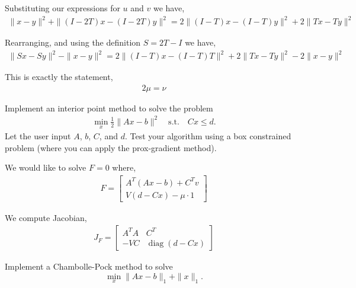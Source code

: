 \documentclass[10pt]{article}
\begin{document}
\begin{solution}[Solution]
\begin{enumerate}[label=(\alph*)]
        Substituting our expressions for \( u \) and \( v \) we have,
        \begin{align*}
            \| x - y \|^2 + \| (I-2T)x - (I-2T)y \|^2 = 2\|(I-T)x - (I-T)y\|^2 + 2\|Tx-Ty\|^2
        \end{align*}

        Rearranging, and using the definition \( S = 2T-I \) we have,
        \begin{align*}
            \|Sx-Sy\|^2 - \|x-y\|^2 = 2\|(I-T)x - (I-T)T\|^2 + 2\|Tx-Ty\|^2 - 2\|x-y\|^2
        \end{align*}

        This is exactly the statement,
        \begin{align*}
            2\mu = \nu \tag*{\qed}
        \end{align*}
        
\end{enumerate}
\end{solution}

\begin{problem}[Problem 4]
Implement an interior point method to solve the problem 
\begin{align*}
    \min_x \frac{1}{2}\|Ax-b\|^2 \quad \mbox{s.t.} \quad Cx \leq d. 
\end{align*}
Let the user input \( A \), \( b \), \( C \), and \( d \). Test your algorithm using a box constrained problem 
(where you can apply the prox-gradient method). 
\end{problem}

\begin{solution}[Solution]
We would like to solve \( F=0 \) where,
\begin{align*}
    F = \left[\begin{array}{c}A^T(Ax-b)+C^Tv \\ V(d-Cx) - \mu \cdot 1\end{array}\right]
\end{align*}

We compute Jacobian,
\begin{align*}
    J_F = \left[\begin{array}{cc}A^TA & C^T \\ -VC & \operatorname{diag}(d-Cx) \end{array}\right]
\end{align*}


\end{solution}

\begin{problem}[Problem 5]
Implement a Chambolle-Pock method to solve  
\[
\min_{x} \|Ax-b\|_1 + \|x\|_1. 
\]
\end{problem}
\end{document}
